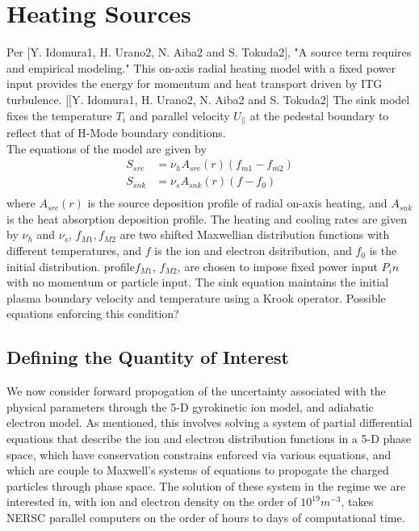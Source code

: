 \documentclass{article}
\begin{document}
\section{Heating Sources}
Per [Y. Idomura1, H. Urano2, N. Aiba2 and S. Tokuda2], "A source term requires and empirical modeling." This on-axis radial heating model with a fixed power input provides the energy for momentum and heat transport driven by ITG turbulence. [[Y. Idomura1, H. Urano2, N. Aiba2 and S. Tokuda2] The sink model fixes the temperature $T_i$ and parallel velocity $U_{||}$  at the pedestal boundary to reflect that of H-Mode boundary conditions.\\
The equations of the model are given by
\begin{align*}
S_{src} &= \nu_h A_{src}(r)(f_{m1} - f_{m2})\\
S_{snk} &= \nu_s A_{snk}(r)(f-f_0)\\	
\end{align*}
where $A_{src}(r)$ is the source deposition profile of radial on-axis heating, and $A_{snk}$ is the heat absorption deposition profile. The heating and cooling rates are given by $\nu_h$ and $\nu_s$, $f_{M1}, f_{M2}$ are two shifted Maxwellian distribution functions with different temperatures, and $f$ is the ion and electron dsitribution, and $f_0$ is the initial distribution. profile$f_{M1}$, $f_{M2}$, are chosen to impose fixed power input $P_in$ with no momentum or particle input.  The sink equation maintains the initial plasma boundary velocity and temperature using a Krook operator. Possible equations enforcing this condition?\\

\vspace{0.01cm}

\noindent
\subsection{Defining the Quantity of Interest}
We now consider forward propogation of the uncertainty associated with the physical parameters through the 5-D gyrokinetic ion model, and adiabatic electron model. As mentioned, this involves solving a system of partial differential equations that describe the ion and electron distribution functions in a 5-D phase space, which have conservation constrains enforced via various equations, and which are couple to Maxwell's systems of equations to propogate the charged particles through phase space. The solution of these system in the regime we are interested in, with ion and electron density on the order of $10^{19}m^{-3}$, takes NERSC parallel computers on the order of hours to days of computational time.\\
\end{document}
